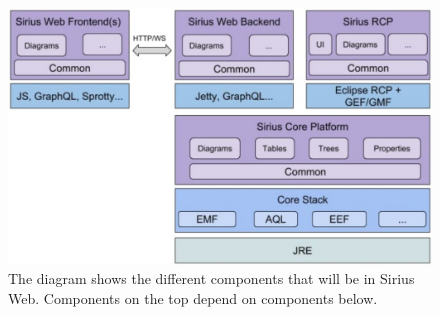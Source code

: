 \begin{figure}[htbp]  %
  \centering
  \includegraphics[width=\textwidth]{figures/Sirius-future-web-architecture}
  \caption[The Sirius Web Architecture]{The diagram shows the different components that will be in Sirius Web. Components on the top depend on components below.~\cite[p.~37]{davidSiriusCon2018Sirius2018}}\label{fig:sirius-web-architecture}
\end{figure}


